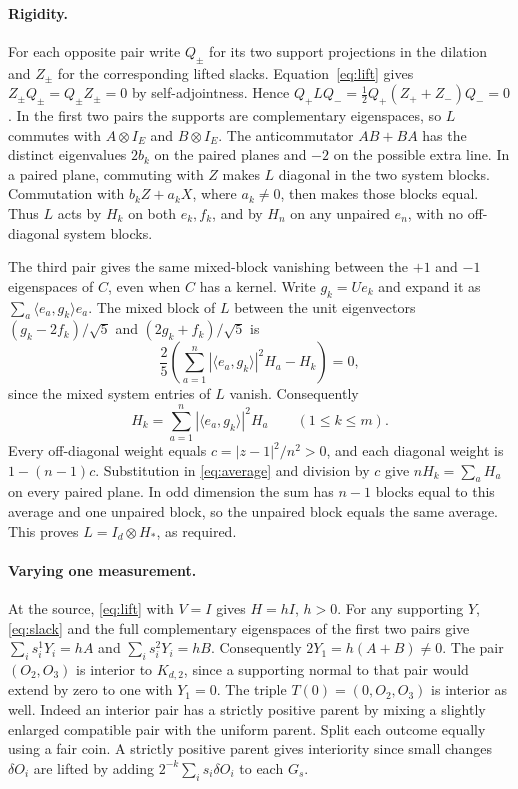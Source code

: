 \documentclass[10pt,a4paper]{article}
\begin{document}
\paragraph{Rigidity.}
For each opposite pair write \(Q_\pm\) for its two support projections in the dilation and \(Z_\pm\) for the corresponding lifted slacks. Equation~\eqref{eq:lift} gives \(Z_\pm Q_\pm=Q_\pm Z_\pm=0\) by self-adjointness. Hence \(Q_+LQ_-=\tfrac12 Q_+(Z_++Z_-)Q_-=0\). In the first two pairs the supports are complementary eigenspaces, so \(L\) commutes with \(A\otimes I_E\) and \(B\otimes I_E\). The anticommutator \(AB+BA\) has the distinct eigenvalues \(2b_k\) on the paired planes and \(-2\) on the possible extra line. In a paired plane, commuting with \(Z\) makes \(L\) diagonal in the two system blocks. Commutation with \(b_kZ+a_kX\), where \(a_k\ne0\), then makes those blocks equal. Thus \(L\) acts by \(H_k\) on both \(e_k,f_k\), and by \(H_n\) on any unpaired \(e_n\), with no off-diagonal system blocks.

The third pair gives the same mixed-block vanishing between the \(+1\) and \(-1\) eigenspaces of \(C\), even when \(C\) has a kernel. Write \(g_k=Ue_k\) and expand it as \(\sum_a \langle e_a,g_k\rangle e_a\). The mixed block of \(L\) between the unit eigenvectors \((g_k-2f_k)/\sqrt5\) and \((2g_k+f_k)/\sqrt5\) is
\[
 \frac{2}{5}\left(\sum_{a=1}^n|\langle e_a,g_k\rangle|^2 H_a-H_k\right)=0,
\]
since the mixed system entries of \(L\) vanish. Consequently
\begin{equation}\label{eq:average}
 H_k=\sum_{a=1}^n|\langle e_a,g_k\rangle|^2 H_a
 \qquad(1\le k\le m).
\end{equation}
Every off-diagonal weight equals \(c=|z-1|^2/n^2>0\), and each diagonal weight is \(1-(n-1)c\). Substitution in \eqref{eq:average} and division by \(c\) give \(nH_k=\sum_a H_a\) on every paired plane. In odd dimension the sum has \(n-1\) blocks equal to this average and one unpaired block, so the unpaired block equals the same average. This proves \(L=I_d\otimes H_*\), as required.

\paragraph{Varying one measurement.}
At the source, \eqref{eq:lift} with \(V=I\) gives \(H=hI\), \(h>0\). For any supporting \(Y\), \eqref{eq:slack} and the full complementary eigenspaces of the first two pairs give
\(\sum_i s_i^1Y_i=hA\) and \(\sum_i s_i^2Y_i=hB\).
Consequently \(2Y_1=h(A+B)\ne0\). The pair \((O_2,O_3)\) is interior to \(K_{d,2}\), since a supporting normal to that pair would extend by zero to one with \(Y_1=0\). The triple \(T(0)=(0,O_2,O_3)\) is interior as well. Indeed an interior pair has a strictly positive parent by mixing a slightly enlarged compatible pair with the uniform parent. Split each outcome equally using a fair coin. A strictly positive parent gives interiority since small changes \(\delta O_i\) are lifted by adding \(2^{-k}\sum_i s_i\delta O_i\) to each \(G_s\).
\end{document}

